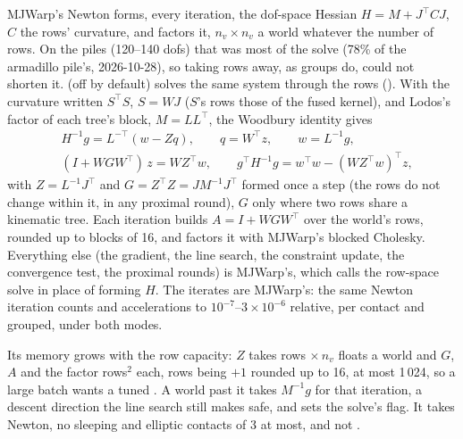 MJWarp's Newton forms, every iteration, the dof-space Hessian $H = M + J^\top C J$, $C$ the rows' curvature, and factors it, $n_v \times n_v$ a world whatever the number of rows. On the piles (120--140 dofs) that was most of the solve (78\% of the armadillo pile's, 2026-10-28), so taking rows away, as groups do, could not shorten it.  (off by default) solves the same system through the rows (). With the curvature written $S^\top S$, $S = WJ$ ($S$'s rows those of the fused kernel), and Lodos's factor of each tree's block, $M = LL^\top$, the Woodbury identity gives
\begin{equation}\label{eq:woodbury}
\begin{aligned}
&H^{-1}g = L^{-\top}(w - Zq), \qquad q = W^\top z, \qquad w = L^{-1}g, \\
&(I + WGW^\top)\,z = WZ^\top w, \qquad g^\top H^{-1} g = w^\top w - (WZ^\top w)^\top z,
\end{aligned}
\end{equation}
with $Z = L^{-1}J^\top$ and $G = Z^\top Z = JM^{-1}J^\top$ formed once a step (the rows do not change within it, in any proximal round), $G$ only where two rows share a kinematic tree. Each iteration builds $A = I + WGW^\top$ over the world's rows, rounded up to blocks of 16, and factors it with MJWarp's blocked Cholesky. Everything else (the gradient, the line search, the constraint update, the convergence test, the proximal rounds) is MJWarp's, which calls the row-space solve in place of forming $H$. The iterates are MJWarp's: the same Newton iteration counts and accelerations to $10^{-7}$--$3\times10^{-6}$ relative, per contact and grouped, under both modes.

Its memory grows with the row capacity: $Z$ takes rows $\times\, n_v$ floats a world and $G$, $A$ and the factor rows$^2$ each, rows being  $+ 1$ rounded up to 16, at most 1\,024, so a large batch wants a tuned . A world past it takes $M^{-1}g$ for that iteration, a descent direction the line search still makes safe, and sets the solve's  flag. It takes Newton, no sleeping and elliptic contacts of  3 at most, and not .

